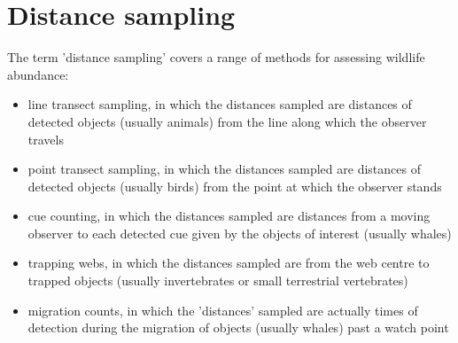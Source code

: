 \section*{Distance sampling}


The term 'distance sampling' covers a range of methods for assessing wildlife abundance:
\begin{itemize}
\item	line transect sampling, in which the distances sampled are distances of detected objects (usually animals) from the line along which the observer travels 
\item	point transect sampling, in which the distances sampled are distances of detected objects (usually birds) from the point at which the observer stands 
\item	cue counting, in which the distances sampled are distances from a moving observer to each detected cue given by the objects of interest (usually whales) 
\item	trapping webs, in which the distances sampled are from the web centre to trapped objects (usually invertebrates or small terrestrial vertebrates) 
\item	migration counts, in which the 'distances' sampled are actually times of detection during the migration of objects (usually whales) past a watch point 
\end{itemize}




